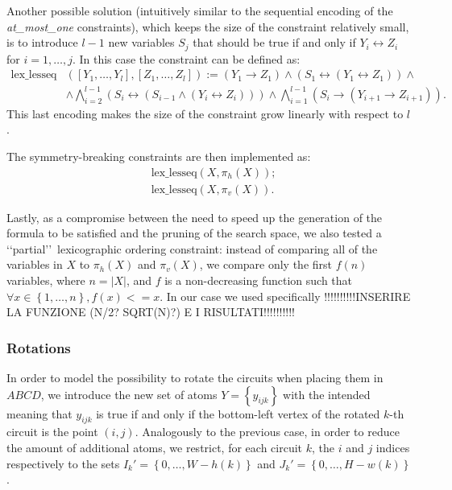 \documentclass[]{article}
\begin{document}
Another possible solution (intuitively similar to the sequential encoding of the \emph{at\_most\_one} constraints), which keeps the size of the constraint relatively small, is to introduce $l-1$ new variables $S_{j}$ that should be true if and only if $Y_i \leftrightarrow Z_i$ for $i=1,\dots, j$. In this case the constraint can be defined as: \begin{align*} \text{lex\_lesseq}&(\left[Y_1,\dots,Y_l\right],\left[Z_1,\dots,Z_l\right]):= \left(Y_1\to Z_1\right) \wedge \left( S_1 \leftrightarrow \left(Y_1 \leftrightarrow Z_1\right) \right) \wedge \\ &\wedge \bigwedge_{i=2}^{l-1} \left(S_i \leftrightarrow \left(S_{i-1} \wedge \left(Y_i \leftrightarrow Z_i \right)\right)\right) \wedge\bigwedge_{i=1}^{l-1} \left(S_i \to \left(Y_{i+1}\to Z_{i+1}\right)\right).
\end{align*}
This last encoding makes the size of the constraint grow linearly with respect to $l$.

The symmetry-breaking constraints are then implemented as:
\begin{align*}
	& \text{lex\_lesseq}(X,\pi_h(X)); \\
	& \text{lex\_lesseq}(X,\pi_v(X)).
\end{align*}

Lastly, as a compromise between the need to speed up the generation of the formula to be satisfied and the pruning of the search space, we also tested a \lq\lq partial\rq\rq\, lexicographic ordering constraint: instead of comparing all of the variables in $X$ to $\pi_h(X)$ and $\pi_v(X)$, we compare only the first $f(n)$ variables, where $n=|X|$, and $f$ is a non-decreasing function such that $\forall x\in\left\{1,\dots,n\right\}, f(x)<=x$. In our case we used specifically !!!!!!!!!!INSERIRE LA FUNZIONE (N/2? SQRT(N)?) E I RISULTATI!!!!!!!!!!

\subsubsection{Rotations}
In order to model the possibility to rotate the circuits when placing them in $ABCD$, we introduce the new set of atoms $Y =\left\{y_{ijk}\right\}$ with the intended meaning that $y_{ijk}$ is true if and only if the bottom-left vertex of the rotated $k$-th circuit is the point $(i,j)$. Analogously to the previous case, in order to reduce the amount of additional atoms, we restrict, for each circuit $k$, the $i$ and $j$ indices respectively to the sets $I_k'=\left\{0,\dots,W-h(k)\right\}$ and $J_k'=\left\{0,\dots,H-w(k)\right\}$. 
\end{document}
